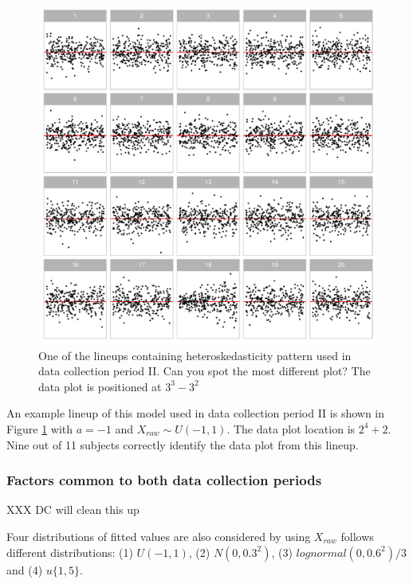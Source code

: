 \documentclass[]{interact}
\theoremstyle{plain}%
\theoremstyle{definition}
\theoremstyle{remark}
\begin{document}
\begin{figure}

{\centering \includegraphics[width=1\linewidth]{paper_comparison_files/figure-latex/example-heter-lineup-1} 

}

\caption{One of the lineups containing heteroskedasticity pattern used in data collection period II. Can you spot the most different plot? The data plot is positioned at $3^3 - 3^2$}\label{fig:example-heter-lineup}
\end{figure}

An example lineup of this model used in data collection period II is
shown in Figure \ref{fig:example-heter-lineup} with \(a = -1\) and
\(X_{raw} \sim U(-1, 1)\). The data plot location is \(2^4 + 2\). Nine
out of 11 subjects correctly identify the data plot from this lineup.

\hypertarget{factors-common-to-both-data-collection-periods}{%
\subsubsection{Factors common to both data collection
periods}\label{factors-common-to-both-data-collection-periods}}

XXX DC will clean this up

Four distributions of fitted values are also considered by using
\(X_{raw}\) follows different distributions: (1) \(U(-1, 1)\), (2)
\(N(0, 0.3^2)\), (3) \(lognormal(0, 0.6^2)/3\) and (4) \(u\{1, 5\}\).
\end{document}
